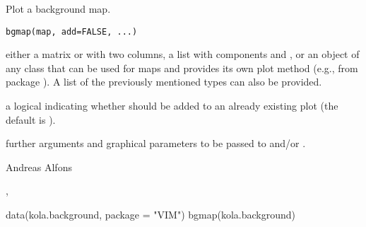%
\begin{Description}\relax
Plot a background map.
\end{Description}
%
\begin{Usage}
\begin{verbatim}
bgmap(map, add=FALSE, ...)
\end{verbatim}
\end{Usage}
%
\begin{Arguments}
\begin{ldescription}
\item[\code{map}] either a matrix or  with two columns, 
a list with components  and , or an object of any 
class that can be used for maps and provides its own plot method 
(e.g.,  from package ).  A list of 
the previously mentioned types can also be provided.
\item[\code{add}] a logical indicating whether  should be 
added to an already existing plot (the default is ).
\item[\code{...}] further arguments and graphical parameters to be passed 
to  and/or .
\end{ldescription}
\end{Arguments}
%
\begin{Author}\relax
Andreas Alfons
\end{Author}
%
\begin{SeeAlso}\relax
{}, 
\end{SeeAlso}
%
\begin{Examples}
\begin{ExampleCode}
data(kola.background, package = "VIM")
bgmap(kola.background)
\end{ExampleCode}
\end{Examples}
